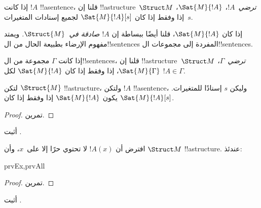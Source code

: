 \documentclass[../../../include/open-logic-section]{subfiles}
\begin{document}
\begin{defn}
إذا كانت $!A$ !!a{sentence}، قلنا إن !!a{structure}~$\Struct M$
\emph{ترضي}~$!A$، $\Sat{M}{!A}$، إذا وفقط إذا كان
$\Sat{M}{!A}[s]$ لجميع إسنادات المتغيرات~$s$.
\end{defn}

إذا كان $\Sat{M}{!A}$، قلنا أيضًا ببساطة إن
\emph{$!A$ صادقة في~$\Struct{M}$.} ويمتد مفهوم الإرضاء بطبيعة الحال
من ال!!{sentence}s المفردة إلى مجموعات ال!!{sentence}s.

\begin{defn}
إذا كانت $\Gamma$ مجموعة من ال!!{sentence}s، قلنا إن
!!a{structure}~$\Struct M$ \emph{ترضي}~$\Gamma$،
$\Sat{M}{\Gamma}$، إذا وفقط إذا كان $\Sat{M}{!A}$ لكل
$!A \in \Gamma$.
\end{defn}

\begin{prop}
  لتكن $\Struct{M}$ !!a{structure}، ولتكن $!A$ !!a{sentence}، وليكن
  $s$ إسنادًا للمتغيرات. يكون $\Sat{M}{!A}$ إذا وفقط إذا كان
  $\Sat{M}{!A}[s]$.
\end{prop}

\begin{proof}
تمرين.
\end{proof}

\begin{prob}
أثبت .
\end{prob}

\begin{prop}
  افترض أن $!A(x)$ لا تحتوي حرًا إلا على~$x$، وأن $\Struct M$
  !!a{structure}. عندئذ:
  \begin{tagenumerate}{prvEx,prvAll}
\end{tagenumerate}
\end{prop}

\begin{proof}
تمرين.
\end{proof}

\begin{prob}
أثبت .
\end{prob}
\end{document}
